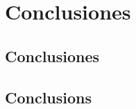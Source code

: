 
\cleardoublepage


\chapter{Conclusiones}
\label{makereference5}

\section{Conclusiones}
\label{makereference5.1}

\section{Conclusions}
\label{makereference5.2}